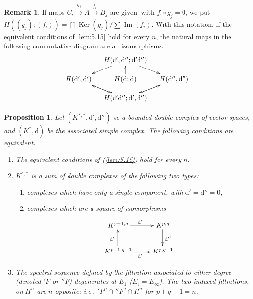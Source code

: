 \documentclass[11pt]{amsart}
\theoremstyle{plain}
\newtheorem{proposition}[theorem]{Proposition}
\theoremstyle{definition}
\newtheorem{remark}[theorem]{Remark}
\DeclareMathOperator{\Ker}{Ker}
\DeclareMathOperator{\Imop}{Im}
\newcommand{\dd}{\mathrm{d}}
\begin{document}
\begin{remark}\label{rem:5.16}
If maps $C_{i} \xrightarrow{g_{j}} A \xrightarrow{f_{i}} B_{j}$ are given, with $f_{i} \circ g_{j} = 0$, we put $H((g_{j}); (f_{i})) = \bigcap \Ker(g_{j})/\sum \Imop(f_{i})$. With this notation, if the equivalent conditions of \ref{lem:5.15} hold for every $n$, the natural maps in the following commutative diagram are all isomorphisms:
\[
\xymatrix@R=1pc@C=1pc{
& H(\dd', \dd''; \dd'\dd'') \ar[dr] \ar[dl] & \\
H(\dd', \dd') \ar[dr] & H(\dd; \dd) \ar[u] & H(\dd'', \dd'') \ar[dl] \\
& H(\dd'\dd''; \dd', \dd'') \ar[ul] \ar[ur] &
}
\]
\end{remark}

\begin{proposition}\label{prop:5.17}
Let $(K^{*,*}, \dd', \dd'')$ be a bounded double complex of vector spaces, and $(K^{*}, \dd)$ be the associated simple complex. The following conditions are equivalent.
\begin{enumerate}
\item[(i)] The equivalent conditions of (\ref{lem:5.15}) hold for every $n$.
\item[(ii)] $K^{*,*}$ is a sum of double complexes of the following two types:
\begin{enumerate}
\item[($\alpha$)] complexes which have only a single component, with $\dd' = \dd'' = 0$,
\item[($\beta$)] complexes which are a square of isomorphisms
\[
\xymatrix{
K^{p-1,q} \ar[r]^{\dd'} & K^{p,q} \ar[d]^{\dd''} \\
K^{p-1,q-1} \ar[u]^{\dd''} \ar[r]_{\dd'} & K^{p,q-1}
}
\]
\end{enumerate}
\item[(iii)] The spectral sequence defined by the filtration associated to either degree (denoted $'F$ or $''F$) degenerates at $E_{1}$ ($E_{1} = E_{\infty}$). The two induced filtrations, on $H^{n}$ are $n$-opposite: i.e., $'F^{p} \cap \, ''F^{q} \cap H^{n}$ for $p + q - 1 = n$.
\end{enumerate}
\end{proposition}
\end{document}
